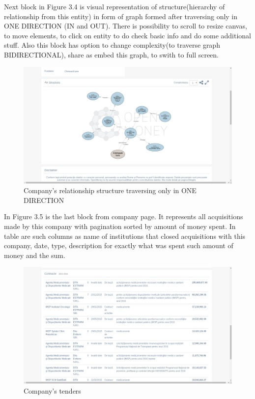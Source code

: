 \documentclass[12pt,a4paper,titlepage]{article}
\begin{document}
	Next block in Figure 3.4 is visual representation of structure(hierarchy of relationship from this entity) in form of graph formed after traversing only in ONE DIRECTION (IN and OUT). There is possibility to scroll to resize canvas, to move elements, to click on entity to do check basic info and do some additional stuff. Also this block has option to change complexity(to traverse graph BIDIRECTIONAL), share as embed this graph, to swith to full screen.
	
	
	\begin{figure}[!ht] 
	\renewcommand\thefigure{3.4} %
	\centering 
	\includegraphics[width=17cm]{company_graph.png} 
	\caption{ Company's relationship structure traversing only in ONE DIRECTION}\label{fig4} 
	\end{figure}
	
	In Figure 3.5 is the last block from company page. It represents all acquisitions made by this company with pagination sorted by amount of money spent. In table are such columns as name of institutions that closed acquisitions with this company, date, type, description for exactly what was spent such amount of money and the sum.
	
	
	
	\begin{figure}[!ht] 
	\renewcommand\thefigure{3.5} %
	\centering 
	\includegraphics[width=17cm]{company_tenders.png} 
	\caption{ Company's tenders }\label{fig4}
	\end{figure}
	
\end{document}
